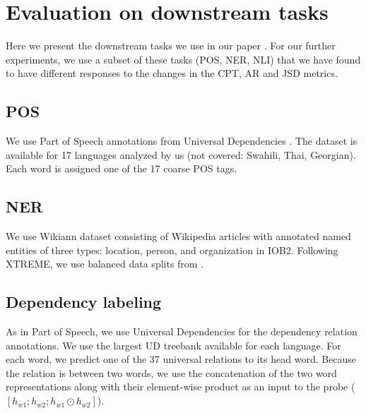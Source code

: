 

\section{Evaluation on downstream tasks}

Here we present the downstream tasks we use in our paper \cite{limisiewicz_tokenization_2023}. For our further experiments, we use a subset of these tasks (POS, NER, NLI) that we have found to have different responses to the changes in the CPT, AR and JSD metrics.

\subsection{POS}

We use Part of Speech annotations from Universal Dependencies \cite{nivre_universal_2020}. The dataset is available for 17 languages analyzed by us (not covered: Swahili, Thai, Georgian).  Each word is assigned one of the 17 coarse POS tags.

\subsection{NER}

We use Wikiann dataset \cite{pan_cross-lingual_2017} consisting of Wikipedia articles with annotated named entities of three types: location, person, and organization in IOB2. Following XTREME, we use balanced data splits from \cite{rahimi_massively_2019}.

\subsection{Dependency labeling}

As in Part of Speech, we use Universal Dependencies \cite{nivre_universal_2020} for the dependency relation annotations. We use the largest UD treebank available for each language.
For each word, we predict one of the 37 universal relations to its head word. Because the relation is between two words, we use the concatenation of the two word representations along with their element-wise product as an input to the probe ($[h_{w1}; h_{w2}; h_{w1} \odot h_{w2}]$).

